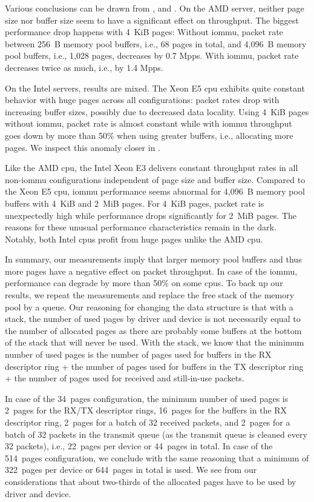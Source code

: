 Various conclusions can be drawn from ,
 and . On
the AMD server, neither page size nor buffer size seem to have a significant
effect on throughput. The biggest performance drop happens with 4~KiB pages:
Without \ac{iommu}, packet rate between 256~B memory pool buffers, i.e., 68
pages in total, and 4,096~B memory pool buffers, i.e., 1,028 pages, decreases by
0.7 Mpps. With \ac{iommu}, packet rate decreases twice as much, i.e., by 1.4
Mpps.

On the Intel servers, results are mixed. The Xeon E5 \ac{cpu} exhibits quite
constant behavior with huge pages across all configurations: packet rates drop
with increasing buffer sizes, possibly due to decreased data locality. Using
4~KiB pages without \ac{iommu}, packet rate is almost constant while with
\ac{iommu} throughput goes down by more than 50\% when using greater buffers,
i.e., allocating more pages. We inspect this anomaly closer in
.

Like the AMD \ac{cpu}, the Intel Xeon E3 delivers constant throughput rates in
all non-\ac{iommu} configurations independent of page size and buffer size.
Compared to the Xeon E5 \ac{cpu}, \ac{iommu} performance seems abnormal for
4,096~B memory pool buffers with 4~KiB and 2~MiB pages. For 4~KiB pages, packet
rate is unexpectedly high while performance drops significantly for 2~MiB pages.
The reasons for these unusual performance characteristics remain in the dark.
Notably, both Intel \acp{cpu} profit from huge pages unlike the AMD \ac{cpu}.

In summary, our measurements imply that larger memory pool buffers and thus more
pages have a negative effect on packet throughput. In case of the \ac{iommu},
performance can degrade by more than 50\% on some \acp{cpu}. To back up our
results, we repeat the measurements and replace the free stack of the memory
pool by a queue. Our reasoning for changing the data structure is that with a
stack, the number of used pages by driver and device is not necessarily equal to
the number of allocated pages as there are probably some buffers at the bottom
of the stack that will never be used. With the stack, we know that the minimum
number of used pages is the number of pages used for buffers in the RX
descriptor ring + the number of pages used for buffers in the TX descriptor ring
+ the number of pages used for received and still-in-use packets.

In case of the 34~pages configuration, the minimum number of used pages is
2~pages for the RX/TX descriptor rings, 16~pages for the buffers in the RX
descriptor ring, 2~pages for a batch of 32 received packets, and 2~pages for a
batch of 32 packets in the transmit queue (as the transmit queue is cleaned
every 32 packets), i.e., 22~pages per device or 44~pages in total. In case of
the 514~pages configuration, we conclude with the same reasoning that a minimum
of 322~pages per device or 644~pages in total is used. We see from our
considerations that about two-thirds of the allocated pages have to be used by
driver and device.

